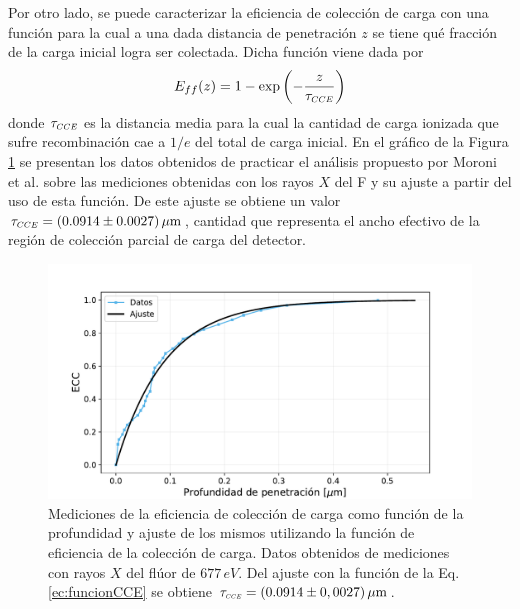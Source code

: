 Por otro lado, se puede caracterizar la eficiencia de colección de carga con una función para la cual a una dada distancia de penetración $z$ se tiene qué fracción de la carga inicial logra ser colectada. Dicha función viene dada por
\begin{equation}
    E_{ff}(z) = 1 - 
    \exp
    \left(
        -\frac{z}{\tau_{\scaleto{CCE}{4pt}}}
    \right)
        \label{ec:funcionCCE}
\end{equation}
donde $\tau_{\scaleto{CCE}{4pt}}$ es la distancia media para la cual la cantidad de carga ionizada que sufre recombinación cae a $1/e$ del total de carga inicial. En el gráfico de la Figura \ref{fig:EficienciaCC} se presentan los datos obtenidos de practicar el análisis propuesto por Moroni et al.\cite{PCC-CCE-interno} sobre las mediciones obtenidas con los rayos $X$ del F y su ajuste a partir del uso de esta función. De este ajuste se obtiene un valor $\tau_{\scaleto{CCE}{4pt}} = (0.0914 \pm 0.0027)\,\si{\mu m} $, cantidad que representa el ancho efectivo de la región de colección parcial de carga del detector.
\begin{figure}[h]
    \centering
        \includegraphics[scale=0.5]{Figs/CCE_vs_z.pdf}
    \caption{Mediciones de la eficiencia de colección de carga como función de la profundidad y ajuste de los mismos utilizando la función de eficiencia de la colección de carga. Datos obtenidos de mediciones con rayos $X$ del flúor de $677\,\si{eV}$. Del ajuste con la función de la Eq. \ref{ec:funcionCCE} se obtiene $\tau_{\scaleto{CCE}{3pt}} = (0.0914 \pm 0,0027)\,\si{\mu m}$.}
    \label{fig:EficienciaCC}
\end{figure}

